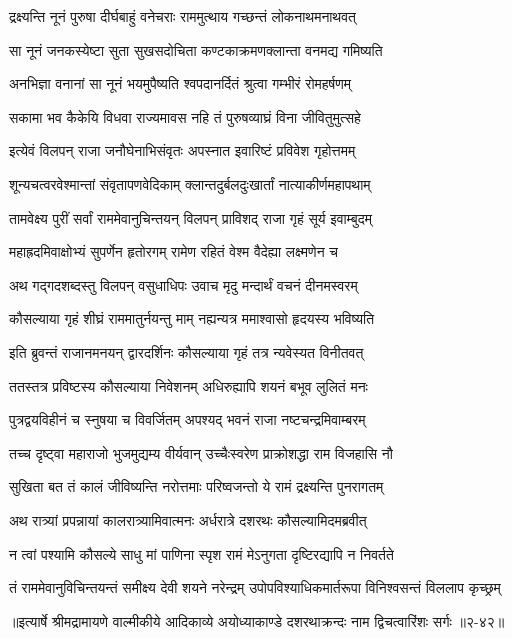 \twolineshloka
{द्रक्ष्यन्ति नूनं पुरुषा दीर्घबाहुं वनेचराः}
{राममुत्थाय गच्छन्तं लोकनाथमनाथवत्} %

\twolineshloka
{सा नूनं जनकस्येष्टा सुता सुखसदोचिता}
{कण्टकाक्रमणक्लान्ता वनमद्य गमिष्यति} %

\twolineshloka
{अनभिज्ञा वनानां सा नूनं भयमुपैष्यति}
{श्वपदानर्दितं श्रुत्वा गम्भीरं रोमहर्षणम्} %

\twolineshloka
{सकामा भव कैकेयि विधवा राज्यमावस}
{नहि तं पुरुषव्याघ्रं विना जीवितुमुत्सहे} %

\twolineshloka
{इत्येवं विलपन् राजा जनौघेनाभिसंवृतः}
{अपस्नात इवारिष्टं प्रविवेश गृहोत्तमम्} %

\twolineshloka
{शून्यचत्वरवेश्मान्तां संवृतापणवेदिकाम्}
{क्लान्तदुर्बलदुःखार्तां नात्याकीर्णमहापथाम्} %

\twolineshloka
{तामवेक्ष्य पुरीं सर्वां राममेवानुचिन्तयन्}
{विलपन् प्राविशद् राजा गृहं सूर्य इवाम्बुदम्} %

\twolineshloka
{महाह्रदमिवाक्षोभ्यं सुपर्णेन हृतोरगम्}
{रामेण रहितं वेश्म वैदेह्या लक्ष्मणेन च} %

\twolineshloka
{अथ गद्गदशब्दस्तु विलपन् वसुधाधिपः}
{उवाच मृदु मन्दार्थं वचनं दीनमस्वरम्} %

\twolineshloka
{कौसल्याया गृहं शीघ्रं राममातुर्नयन्तु माम्}
{नह्यन्यत्र ममाश्वासो हृदयस्य भविष्यति} %

\twolineshloka
{इति ब्रुवन्तं राजानमनयन् द्वारदर्शिनः}
{कौसल्याया गृहं तत्र न्यवेस्यत विनीतवत्} %

\twolineshloka
{ततस्तत्र प्रविष्टस्य कौसल्याया निवेशनम्}
{अधिरुह्यापि शयनं बभूव लुलितं मनः} %

\twolineshloka
{पुत्रद्वयविहीनं च स्नुषया च विवर्जितम्}
{अपश्यद् भवनं राजा नष्टचन्द्रमिवाम्बरम्} %

\twolineshloka
{तच्च दृष्ट्वा महाराजो भुजमुद्यम्य वीर्यवान्}
{उच्चैःस्वरेण प्राक्रोशद्धा राम विजहासि नौ} %

\twolineshloka
{सुखिता बत तं कालं जीविष्यन्ति नरोत्तमाः}
{परिष्वजन्तो ये रामं द्रक्ष्यन्ति पुनरागतम्} %

\twolineshloka
{अथ रात्र्यां प्रपन्नायां कालरात्र्यामिवात्मनः}
{अर्धरात्रे दशरथः कौसल्यामिदमब्रवीत्} %

\twolineshloka
{न त्वां पश्यामि कौसल्ये साधु मां पाणिना स्पृश}
{रामं मेऽनुगता दृष्टिरद्यापि न निवर्तते} %

\twolineshloka
{तं राममेवानुविचिन्तयन्तं समीक्ष्य देवी शयने नरेन्द्रम्}
{उपोपविश्याधिकमार्तरूपा विनिश्वसन्तं विललाप कृच्छ्रम्} %


॥इत्यार्षे श्रीमद्रामायणे वाल्मीकीये आदिकाव्ये अयोध्याकाण्डे दशरथाक्रन्दः नाम द्विचत्वारिंशः सर्गः ॥२-४२॥
